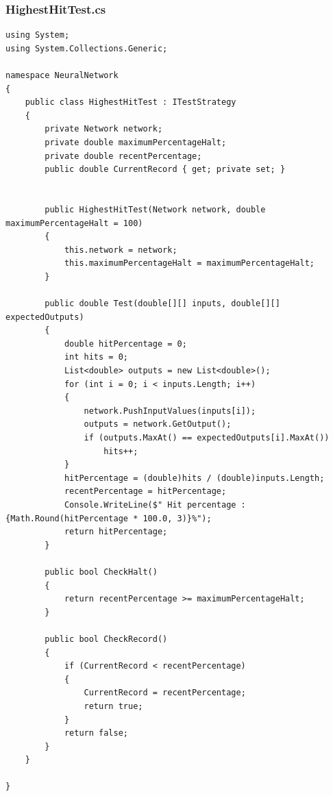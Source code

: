 \documentclass[12pt,a4paper]{article}
\begin{document}
\subsubsection*{HighestHitTest.cs}
\begin{lstlisting}
using System;
using System.Collections.Generic;

namespace NeuralNetwork
{
    public class HighestHitTest : ITestStrategy
    {
        private Network network;
        private double maximumPercentageHalt;
        private double recentPercentage;
        public double CurrentRecord { get; private set; }


        public HighestHitTest(Network network, double maximumPercentageHalt = 100)
        {
            this.network = network;
            this.maximumPercentageHalt = maximumPercentageHalt;
        }

        public double Test(double[][] inputs, double[][] expectedOutputs)
        {
            double hitPercentage = 0;
            int hits = 0;
            List<double> outputs = new List<double>();
            for (int i = 0; i < inputs.Length; i++)
            {
                network.PushInputValues(inputs[i]);
                outputs = network.GetOutput();
                if (outputs.MaxAt() == expectedOutputs[i].MaxAt())
                    hits++;
            }
            hitPercentage = (double)hits / (double)inputs.Length;
            recentPercentage = hitPercentage;
            Console.WriteLine($" Hit percentage : {Math.Round(hitPercentage * 100.0, 3)}%");
            return hitPercentage;
        }

        public bool CheckHalt()
        {
            return recentPercentage >= maximumPercentageHalt;
        }

        public bool CheckRecord()
        {
            if (CurrentRecord < recentPercentage)
            {
                CurrentRecord = recentPercentage;
                return true;
            }
            return false;
        }
    }

}\end{lstlisting}
\pagebreak
\end{document}
